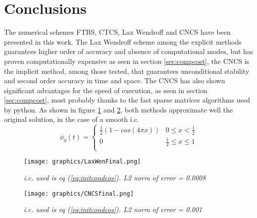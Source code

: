 

\section{Conclusions}
The numerical schemes FTBS, CTCS, Lax Wendroff and CNCS have been presented in this work. The Lax Wendroff scheme among the explicit methods guarantees higher order of accuracy and absence of computational modes, but has proven computationally expensive as seen in section \ref{sec:compcost}, the CNCS is the implicit method, among those tested, that guarantees unconditional stability and second order accuracy in time and space. The CNCS has also shown significant advantages for the speed of execution, as seen in section \ref{sec:compcost}, most probably thanks to the fast sparse matrices algorithms used by python.
As shown in figure \ref{fig:laxFinal} and \ref{fig:cncsFinal}, both methods approximate well the original solution, in the case of a smooth i.c.
\begin{equation}
\phi_0(t)=\left\{
\begin{array}{lr}
\frac{1}{2}(1-cos(4\pi x)) & 0\leq x<\frac{1}{2} \\
0 &  \frac{1}{2}\leq x\leq 1 \\
\end{array}
\right.
\label{eq:initcondcos}
\end{equation}
 
\begin{figure}[H]
	\begin{center}
		\texttt{[image: graphics/LaxWenFinal.png]}
	\end{center}%
	\caption[LaxWenFinal]{ \em i.c. used is eq (\ref{eq:initcondcos}). L2 norm of error = 0.0008}
	\label{fig:laxFinal}
\end{figure}

\begin{figure}[H]
	\begin{center}
		\texttt{[image: graphics/CNCSfinal.png]}
	\end{center}%
	\caption[CNCS final]{ \em i.c. used is eq (\ref{eq:initcondcos}). L2 norm of error = 0.001}
	\label{fig:cncsFinal}
\end{figure}
